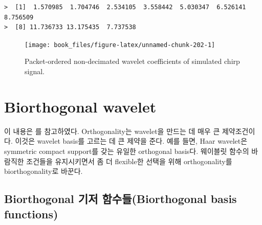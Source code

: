 \documentclass[b5paper,]{scrbook}
\makeatletter
\newenvironment{Shaded}{\begin{snugshade}}{\end{snugshade}}
\newcommand{\KeywordTok}[1]{\textcolor[rgb]{0.13,0.29,0.53}{\textbf{#1}}}
\newcommand{\DataTypeTok}[1]{\textcolor[rgb]{0.13,0.29,0.53}{#1}}
\newcommand{\DecValTok}[1]{\textcolor[rgb]{0.00,0.00,0.81}{#1}}
\newcommand{\StringTok}[1]{\textcolor[rgb]{0.31,0.60,0.02}{#1}}
\newcommand{\OperatorTok}[1]{\textcolor[rgb]{0.81,0.36,0.00}{\textbf{#1}}}
\newcommand{\NormalTok}[1]{#1}
\theoremstyle{plain}
\theoremstyle{definition}
\numberwithin{equation}{section}
\newenvironment{kframe}{%
\medskip{}
\setlength{\fboxsep}{.8em}
 \def\at@end@of@kframe{}%
 \ifinner\ifhmode%
  \def\at@end@of@kframe{\end{minipage}}%
  \begin{minipage}{\columnwidth}%
 \fi\fi%
 \def\FrameCommand##1{\hskip\@totalleftmargin \hskip-\fboxsep
 \colorbox{shadecolor}{##1}\hskip-\fboxsep
     \hskip-\linewidth \hskip-\@totalleftmargin \hskip\columnwidth}%
 \MakeFramed {\advance\hsize-\width
   \@totalleftmargin\z@ \linewidth\hsize
   \@setminipage}}%
 {\par\unskip\endMakeFramed%
 \at@end@of@kframe}
\renewenvironment{Shaded}{\begin{kframe}}{\end{kframe}}
\makeatother
\begin{document}
\begin{verbatim}
>  [1]  1.570985  1.704746  2.534105  3.558442  5.030347  6.526141  8.756509
>  [8] 11.736733 13.175435  7.737538
\end{verbatim}

\begin{Shaded}
\end{Shaded}

\begin{figure}

{\centering \texttt{[image: book\_files/figure-latex/unnamed-chunk-202-1]} 

}

\caption{Packet-ordered non-decimated wavelet coefficients of simulated chirp signal.}\label{fig:unnamed-chunk-202}
\end{figure}

\section{Biorthogonal wavelet}\label{biorthogonal-wavelet}

이 내용은 \citep{Gomes2015}를 참고하였다. Orthogonality는 wavelet을
만드는 데 매우 큰 제약조건이다. 이것은 wavelet basis를 고르는 데 큰
제약을 준다. 예를 들면, Haar wavelet은 symmetric compact support를 갖는
유일한 orthogonal basis다. 웨이블릿 함수의 바람직한 조건들을
유지시키면서 좀 더 flexible한 선택을 위해 orthogonality를
biorthogonality로 바꾼다.

\subsection{Biorthogonal 기저 함수들(Biorthogonal basis
functions)}\label{biorthogonal--biorthogonal-basis-functions}
\end{document}
